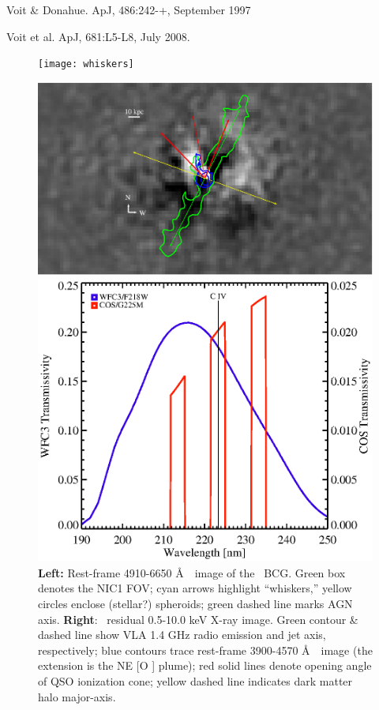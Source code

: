 \documentclass[12pt]{article}
\begin{document}
\noindent [43] Voit \& Donahue. ApJ, 486:242-+, September 1997

\noindent [44] Voit et al. ApJ, 681:L5-L8, July 2008.

\begin{figure}[htp]
  \begin{center}
    \begin{minipage}{0.48\linewidth}	
      \texttt{[image: whiskers]}
    \end{minipage}
    \begin{minipage}{0.47\linewidth}
      \includegraphics*[width=\textwidth, trim=47mm 7mm 49mm 5mm, clip]{xray_sub_cones}
    \end{minipage}
    \caption{{\bf{Left:}} Rest-frame 4910-6650 \AA\ \hst\ image of the
      \irs\ BCG. Green box denotes the NIC1 FOV; cyan arrows highlight
      ``whiskers,'' yellow circles enclose (stellar?) spheroids; green
      dashed line marks AGN axis. {\bf{Right}}: \chandra\ residual
      0.5-10.0 keV X-ray image. Green contour \& dashed line show VLA
      1.4 GHz radio emission and jet axis, respectively; blue contours
      trace rest-frame 3900-4570 \AA\ \hst\ image (the extension is
      the NE [O ] plume); red solid lines denote opening
      angle of QSO ionization cone; yellow dashed line indicates dark
      matter halo major-axis.}
    \label{fig:i09}
    \begin{minipage}{0.53\linewidth}
      \includegraphics*[width=\textwidth, trim=29mm 5mm 28mm 5mm, clip]{uvis}

\end{minipage}
\end{center}
\end{figure}
\end{document}
